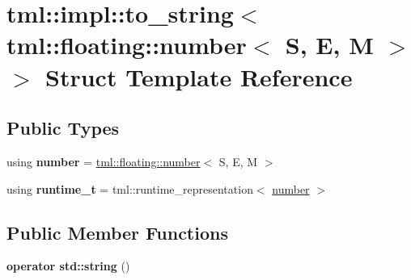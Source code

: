 \hypertarget{structtml_1_1impl_1_1to__string_3_01tml_1_1floating_1_1number_3_01_s_00_01_e_00_01_m_01_4_01_4}{\section{tml\+:\+:impl\+:\+:to\+\_\+string$<$ tml\+:\+:floating\+:\+:number$<$ S, E, M $>$ $>$ Struct Template Reference}
\label{structtml_1_1impl_1_1to__string_3_01tml_1_1floating_1_1number_3_01_s_00_01_e_00_01_m_01_4_01_4}
}
\subsection*{Public Types}
\begin{DoxyCompactItemize}
\item 
\hypertarget{structtml_1_1impl_1_1to__string_3_01tml_1_1floating_1_1number_3_01_s_00_01_e_00_01_m_01_4_01_4_ac234af4ae6b0fd549fa2fd5d270c9ece}{using {\bfseries number} = \hyperlink{structtml_1_1floating_1_1number}{tml\+::floating\+::number}$<$ S, E, M $>$}\label{structtml_1_1impl_1_1to__string_3_01tml_1_1floating_1_1number_3_01_s_00_01_e_00_01_m_01_4_01_4_ac234af4ae6b0fd549fa2fd5d270c9ece}

\item 
\hypertarget{structtml_1_1impl_1_1to__string_3_01tml_1_1floating_1_1number_3_01_s_00_01_e_00_01_m_01_4_01_4_a054aa27e20382cf499ed48518d9c0183}{using {\bfseries runtime\+\_\+t} = tml\+::runtime\+\_\+representation$<$ \hyperlink{structtml_1_1floating_1_1number}{number} $>$}\label{structtml_1_1impl_1_1to__string_3_01tml_1_1floating_1_1number_3_01_s_00_01_e_00_01_m_01_4_01_4_a054aa27e20382cf499ed48518d9c0183}

\end{DoxyCompactItemize}
\subsection*{Public Member Functions}
\begin{DoxyCompactItemize}
\item 
\hypertarget{structtml_1_1impl_1_1to__string_3_01tml_1_1floating_1_1number_3_01_s_00_01_e_00_01_m_01_4_01_4_a1265d354f263d9efdc580ed435b5f89b}{{\bfseries operator std\+::string} ()}\label{structtml_1_1impl_1_1to__string_3_01tml_1_1floating_1_1number_3_01_s_00_01_e_00_01_m_01_4_01_4_a1265d354f263d9efdc580ed435b5f89b}

\end{DoxyCompactItemize}


